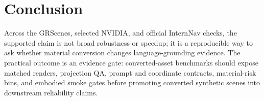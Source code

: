 \section{Conclusion}
\label{sec:conclusion}

Across the GRScenes, selected NVIDIA, and official InternNav checks, the
supported claim is not broad robustness or speedup; it is a reproducible way to
ask whether material conversion changes language-grounding evidence. The
practical outcome is an evidence gate: converted-asset benchmarks should expose
matched renders, projection QA, prompt and coordinate contracts,
material-risk bins, and embodied smoke gates before promoting converted
synthetic scenes into downstream reliability claims.

